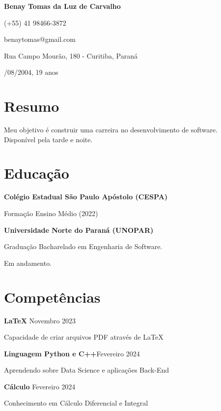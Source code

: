 \documentclass{article}
\newcommand{\cvsection}[1]{\section*{\rmfamily#1}}
\begin{document}
\selectfont

\begin{center}
    \Huge{
    \rmfamily
    \textbf{Benay Tomas da Luz de Carvalho}}
\end{center}
\vspace{5pt}


\setlength{\parskip}{1pt}
\renewcommand{\arraystretch}{1.25}


\begin{center}

{\large

\noindent (+55) 41 98466-3872

\noindent benaytomas@gmail.com

\noindent Rua Campo Mourão, 180 - Curitiba, Paraná

/08/2004, 19 anos

}

\end{center}

\setlength{\parskip}{3pt}

\cvsection{Resumo}

\indent
{\large

Meu objetivo é construir uma carreira no desenvolvimento de software.\\
\indent Disponível pela tarde e noite.

}

\cvsection{Educação}
\indent 
{\large

\textbf{Colégio Estadual São Paulo Apóstolo (CESPA)}

\hspace{2em}Formação Ensino Médio (2022)

\textbf{Universidade Norte do Paraná (UNOPAR)}

\hspace{2em}Graduação Bacharelado em Engenharia de Software.

\hspace{2em}Em andamento.
}

\vspace*{.15cm}
\cvsection{Competências}
\noindent

{\large

\textbf{LaTeX} \hfill Novembro 2023

\hspace{2em}Capacidade de criar arquivos PDF através de LaTeX

\textbf{Linguagem Python e C++}\hfill Fevereiro 2024

\indent
\hspace{2em}Aprendendo sobre Data Science e aplicações Back-End

\textbf{Cálculo} \hfill Fevereiro 2024

\hspace{2em}Conhecimento em Cálculo Diferencial e Integral

}
\end{document}
